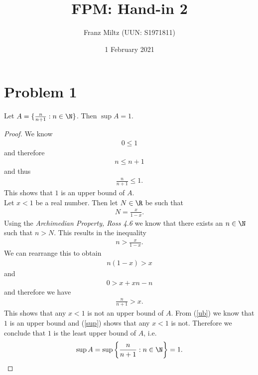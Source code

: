 \documentclass{article}
\begin{document}
\title{FPM: Hand-in 2}
\author{Franz Miltz (UUN: S1971811)}
\date{1 February 2021}
\maketitle

\section*{Problem 1}

\begin{claim*}
	Let $A=\{\frac{n}{n+1}:n\in\N\}$. Then $\sup A = 1$.
\end{claim*}
\begin{proof}
	We know
	\begin{align*}
		0 \leq 1
	\end{align*}
	and therefore
	\begin{align*}
		n \leq n + 1
	\end{align*}
	and thus
	\begin{align}
		\label{ub}
		\frac{n}{n+1}\leq 1.
	\end{align}
	This shows that $1$ is an upper bound of $A$.\\
	Let $x<1$ be a real number. Then let $N\in\R$ be such that
	\begin{align*}
		N = \frac{x}{1-x}.
	\end{align*}
	Using the \emph{Archimedian Property, Ross 4.6} we know that there exists
	an $n\in\N$ such that $n > N$. This results in the inequality
	\begin{align*}
		n > \frac{x}{1-x}.
	\end{align*}
	We can rearrange this to obtain
	\begin{align*}
		n(1-x) > x
	\end{align*}
	and
	\begin{align*}
		0 > x + xn - n
	\end{align*}
	and therefore we have
	\begin{align}
		\label{sup}
		\frac{n}{n+1} > x.
	\end{align}
	This shows that any $x<1$ is not an upper bound of $A$.
	From (\ref{ub}) we know that $1$ is an upper bound and (\ref{sup}) shows
	that any $x<1$ is not. Therefore we conclude that
	$1$ is the least upper bound of $A$, i.e.
	\begin{align*}
		\sup A = \sup\left\{\frac{n}{n+1}:n\in\N\right\} = 1.
	\end{align*}
\end{proof}
\end{document}
